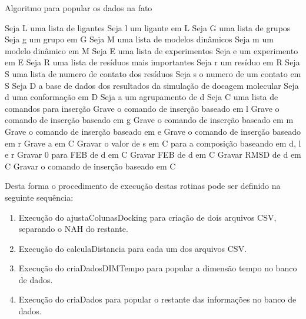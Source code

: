 \begin{algorithm}[H]
\caption{Algoritmo para popular os dados na fato}
\label{alg:criaDadosFato}
{\fontsize{10}{10}\selectfont
\begin{algorithmic}[1]
	\STATE Seja L uma lista de ligantes
	\STATE Seja l um ligante em L
	\STATE Seja G uma lista de grupos
	\STATE Seja g um grupo em G
	\STATE Seja M uma lista de modelos dinâmicos
	\STATE Seja m um modelo dinâmico em M
	\STATE Seja E uma lista de experimentos
	\STATE Seja e um experimento em E
	\STATE Seja R uma lista de resíduos mais importantes
	\STATE Seja r um resíduo em R
	\STATE Seja S uma lista de numero de contato dos resíduos
	\STATE Seja s o numero de um contato em S
	\STATE Seja D a base de dados dos resultados da simulação de docagem molecular
	\STATE Seja d uma conformação em D
	\STATE Seja a um agrupamento de d
	\STATE Seja C uma lista de comandos para inserção
		\STATE Grave o comando de inserção baseado em l
	\ENDFOR
		\STATE Grave o comando de inserção baseado em g
        \ENDFOR
		\STATE Grave o comando de inserção baseado em m
        \ENDFOR
		\STATE Grave o comando de inserção baseado em e
        \ENDFOR
		\STATE Grave o comando de inserção baseado em r
	\ENDFOR
		\STATE Grave a em C
				\STATE Gravar o valor de s em C para a composição baseando em d, l e r
			\ENDFOR
				\STATE Gravar 0 para FEB de d em C
			\ELSE
				\STATE Gravar FEB de d em C
			\ENDIF
			\STATE Gravar RMSD de d em C
			\STATE Gravar o comando de inserção baseado em C
		\ENDFOR
	\ENDFOR
\end{algorithmic}
}
\end{algorithm}

Desta forma o procedimento de execução destas rotinas pode ser definido na seguinte sequência:

\begin{enumerate}
    \item Execução do ajustaColunasDocking para criação de dois arquivos CSV, separando o NAH do restante.
    \item Execução do calculaDistancia para cada um dos arquivos CSV.
    \item Execução do criaDadosDIMTempo para popular a dimensão tempo no banco de dados.
    \item Execução do criaDados para popular o restante das informações no banco de dados.
\end{enumerate}

